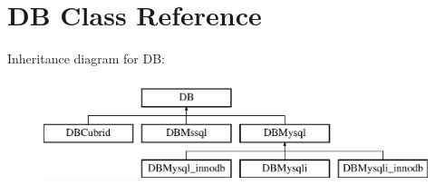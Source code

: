 \hypertarget{classDB}{}\section{D\+B Class Reference}
\label{classDB}
Inheritance diagram for D\+B\+:\begin{figure}[H]
\begin{center}
\leavevmode
\includegraphics[height=3.000000cm]{classDB}
\end{center}
\end{figure}

